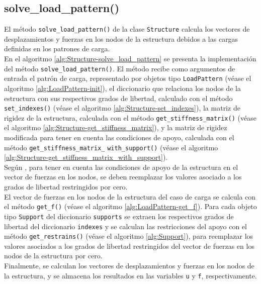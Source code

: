 \subsection{solve\_load\_pattern()}

El método \verb|solve_load_pattern()| de la clase \verb|Structure| calcula los vectores de desplazamientos y fuerzas en los nodos de la estructura debidos a las cargas definidas en los patrones de carga.\\

En el algoritmo \ref{alg:Structure-solve_load_pattern} se presenta la implementación del método \verb|solve_load_pattern()|. El método recibe como argumentos de entrada el patrón de carga, representado por objetos tipo \verb|LoadPattern| (véase el algoritmo \ref{alg:LoadPattern-init}), el diccionario que relaciona los nodos de la estructura con sus respectivos grados de libertad, calculado con el método \verb|set_indexes()| (véase el algoritmo \ref{alg:Structure-set_indexes}), la matriz de rigidez de la estructura, calculada con el método \verb|get_stiffness_matrix()| (véase el algoritmo \ref{alg:Structure-get_stiffness_matrix}), y la matriz de rigidez modificada para tener en cuenta las condiciones de apoyo, calculada con el método \verb|get_stiffness_matrix_| \verb|with_support()| (véase el algoritmo \ref{alg:Structure-get_stiffness_matrix_with_support}).\\

Según \cite{reddy1993an}, para tener en cuenta las condiciones de apoyo de la estructura en el vector de fuerzas en los nodos, se deben reemplazar los valores asociado a los grados de libertad restringidos por cero.\\

El vector de fuerzas en los nodos de la estructura del caso de carga se calcula con el método \verb|get_f()| (véase el algoritmo \ref{alg:LoadPattern-get_f}). Para cada objeto tipo \verb|Support| del diccionario \verb|supports| se extraen los respectivos grados de libertad del diccionario \verb|indexes| y se calculan las restricciones del apoyo con el método \verb|get_restrains()| (véase el algoritmo \ref{alg:Support}), para reemplazar los valores asociados a los grados de libertad restringidos del vector de fuerzas en los nodos de la estructura por cero.\\

Finalmente, se calculan los vectores de desplazamientos y fuerzas en los nodos de la estructura, y se almacena los resultados en las variables \verb|u| y \verb|f|, respectivamente.\\

